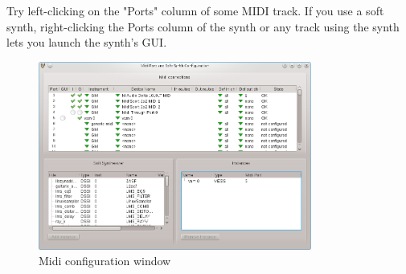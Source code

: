 \documentclass[a4paper]{report}
\newcommand{\screenshotwidth}[0]{0.8\textwidth}
\begin{document}
Try left-clicking on the "Ports" column of some MIDI track.
If you use a soft synth, right-clicking the Ports column of the synth
or any track using the synth lets you launch the synth's GUI.

\begin{figure}[htp]
\centering \includegraphics[width=\screenshotwidth]
{pics/midi_config_window} 
\caption{Midi configuration window}
\label{fig:midi_config_window} 
\end{figure}
\end{document}
